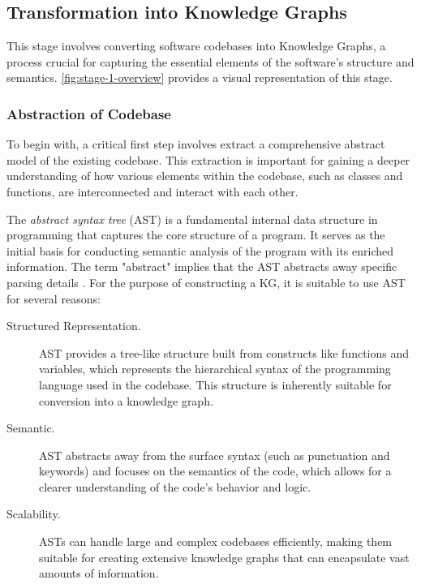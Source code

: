 







\subsection{Transformation into Knowledge Graphs}
This stage involves converting software codebases into Knowledge Graphs, a process crucial for capturing the essential elements of the software's structure and semantics. \autoref{fig:stage-1-overview} provides a visual representation of this stage.

\subsubsection{Abstraction of Codebase} 
To begin with, a critical first step involves extract a comprehensive abstract model of the existing codebase. This extraction is important for gaining a deeper understanding of how various elements within the codebase, such as classes and functions, are interconnected and interact with each other. 


The \textit{abstract syntax tree} (AST) is a fundamental internal data structure in programming that captures the core structure of a program. It serves as the initial basis for conducting semantic analysis of the program with its enriched information. The term "abstract" implies that the AST abstracts away specific parsing details \cite{Thain_2021}. For the purpose of constructing a KG, it is suitable to use AST for several reasons:  

\begin{description}
  \item[Structured Representation.] AST provides a tree-like structure built from constructs like functions and variables, which represents the hierarchical syntax of the programming language used in the codebase. This structure is inherently suitable for conversion into a knowledge graph.
  \item[Semantic.] AST abstracts away from the surface syntax (such as punctuation and keywords) and focuses on the semantics of the code, which allows for a clearer understanding of the code's behavior and logic.
  \item[Scalability.] ASTs can handle large and complex codebases efficiently, making them suitable for creating extensive knowledge graphs that can encapsulate vast amounts of information.
\end{description}



